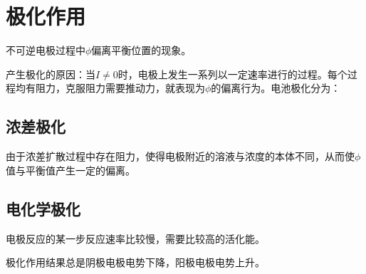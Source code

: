 

\section{极化作用}


不可逆电极过程中$\phi$偏离平衡位置的现象。

产生极化的原因：当$I \neq 0$时，电极上发生一系列以一定速率进行的过程。每个过程均有阻力，克服阻力需要推动力，就表现为$\phi$的偏离行为。电池极化分为：

\subsection{浓差极化}

由于浓差扩散过程中存在阻力，使得电极附近的溶液与浓度的本体不同，从而使$\phi$值与平衡值产生一定的偏离。

\subsection{电化学极化}


电极反应的某一步反应速率比较慢，需要比较高的活化能。


极化作用结果总是阴极电极电势下降，阳极电极电势上升。
